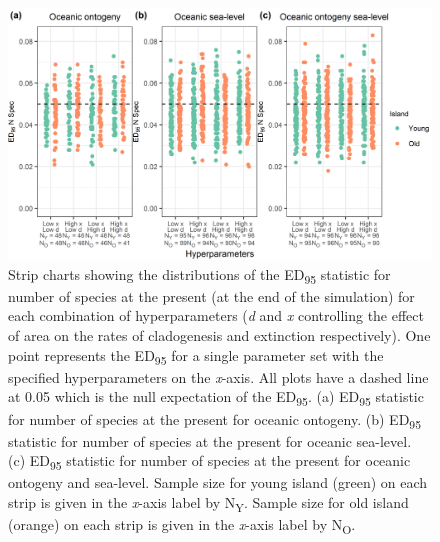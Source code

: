 \begin{figure}
    \centering
    \includegraphics{oceanic_hyperparameters_num_spec.png}
    \caption{Strip charts showing the distributions of the ED\textsubscript{95} statistic for number of species at the present (at the end of the simulation) for each combination of hyperparameters (\textit{d} and \textit{x} controlling the effect of area on the rates of cladogenesis and extinction respectively). One point represents the ED\textsubscript{95} for a single parameter set with the specified hyperparameters on the \textit{x}-axis. All plots have a dashed line at 0.05 which is the null expectation of the ED\textsubscript{95}. (a) ED\textsubscript{95} statistic for number of species at the present for oceanic ontogeny. (b) ED\textsubscript{95} statistic for number of species at the present for oceanic sea-level. (c) ED\textsubscript{95} statistic for number of species at the present for oceanic ontogeny and sea-level. Sample size for young island (green) on each strip is given in the \textit{x}-axis label by N\textsubscript{Y}. Sample size for old island (orange) on each strip is given in the \textit{x}-axis label by N\textsubscript{O}.}
    \label{fig:oceanic_hyperparameters_num_spec}
\end{figure}

